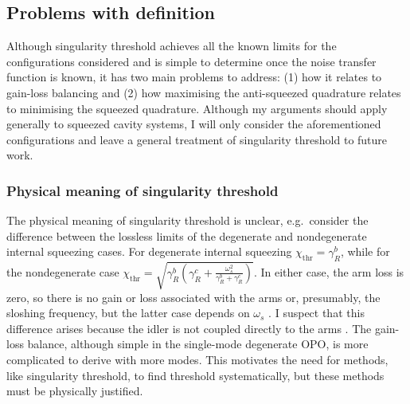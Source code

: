 \subsection{Problems with definition}

Although singularity threshold achieves all the known limits for the configurations considered and is simple to determine once the noise transfer function is known, it has two main problems to address: (1) how it relates to gain-loss balancing and (2) how maximising the anti-squeezed quadrature relates to minimising the squeezed quadrature. 
Although my arguments should apply generally to squeezed cavity systems, I will only consider the aforementioned configurations and leave a general treatment of singularity threshold to future work.

\subsubsection{Physical meaning of singularity threshold}


The physical meaning of singularity threshold is unclear, e.g.\ consider the difference between the lossless limits of the degenerate and nondegenerate internal squeezing cases. For degenerate internal squeezing $\chi_\text{thr}=\gamma^b_R$, while for the nondegenerate case $\chi_\text{thr}=\sqrt{\gamma^b_R(\gamma^c_R+\frac{\omega_s^2}{\gamma^b_R+\gamma^c_R})}$. In either case, the arm loss is zero, so there is no gain or loss associated with the arms or, presumably, the sloshing frequency, but the latter case depends on $\omega_s$ . I suspect that this difference arises because the idler is not coupled directly to the arms . The gain-loss balance, although simple in the single-mode degenerate OPO, is more complicated to derive with more modes. This motivates the need for methods, like singularity threshold, to find threshold systematically, but these methods must be physically justified. 

